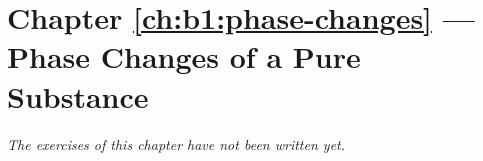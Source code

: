 \section*{Chapter \ref{ch:b1:phase-changes} --- Phase Changes of a Pure Substance}


\emph{The exercises of this chapter have not been written yet.}
